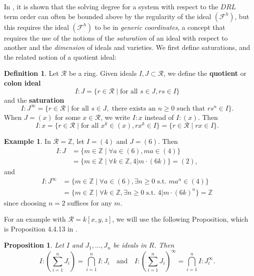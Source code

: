 \documentclass[11pt]{article}
\newcommand{\Z}{\mathbb{Z}}
\newcommand{\F}{\mathcal{F}}
\newtheorem{proposition}{Proposition}
\theoremstyle{definition}
\newtheorem{definition}{Definition}
\newtheorem{example}{Example}
\begin{document}
In \cite{caminata2020solving}, it is shown that the solving degree for a system with respect to the $DRL$ term order can often be bounded above by the regularity of the ideal $(\F^h)$, but this requires the ideal $(\F^h)$ to be in \emph{generic coordinates}, a concept that requires the use of the notions of the \emph{saturation} of an ideal with respect to another and the \emph{dimension} of ideals and varieties. We first define saturations, and the related notion of a quotient ideal: 


\begin{definition}
	Let $\mathcal{R}$ be a ring. Given ideals $I, J \subset \mathcal{R}$, we define the \textbf{quotient} or \textbf{colon ideal} \[ I:J = \{ r \in \mathcal{R} \mid \text{for all } s \in J, rs \in I \} \] and the \textbf{saturation} \[ I:J^\infty = \{r \in \mathcal{R} \mid \text{for all } s \in J, \text{ there exists an } n \geq 0 \text{ such that } rs^n \in I\}. \] When $J = (x)$ for some $x \in \mathcal{R}$, we write $I:x$ instead of $I:(x)$. Then \[ I:x = \{r \in \mathcal{R} \mid \text{for all } x^k \in (x), rx^k \in I\} = \{r \in \mathcal{R} \mid rx \in I\}. \]
\end{definition}


\begin{example}
	In $\mathcal{R} = \Z$, let $I = (4)$ and $J = (6)$. Then \begin{align*}
		I:J &= \{m \in \Z \mid \forall a \in (6), ma \in (4)\} \\
		&= \{m \in \Z \mid \forall k \in \Z, 4 | m \cdot (6k) \} = (2),
	\end{align*} and \begin{align*}
		I:J^\infty &= \{m \in \Z \mid \forall a \in (6), \exists n \geq 0 \text{ s.t. } ma^n \in (4)\} \\
		&= \{m \in \Z \mid \forall k \in \Z, \exists n \geq 0 \text{ s.t. } 4 | m \cdot (6k)^n \} = \Z
	\end{align*} since choosing $n = 2$ suffices for any $m$. 
\end{example}


For an example with $\mathcal{R} = k[x,y,z]$, we will use the following Proposition, which is Proposition 4.4.13 in \cite{cox2013ideals}.


\begin{proposition}
	Let $I$ and $J_1, \dots, J_n$ be ideals in $R$. Then \[ I : \left(\sum_{i=1}^n J_i\right) = \bigcap_{i=1}^n I:J_i \quad \text{and} \quad I : \left(\sum_{i = 1}^n J_i\right)^\infty = \bigcap_{i = 1}^n I:J_i^\infty. \]
\end{proposition}
\end{document}
